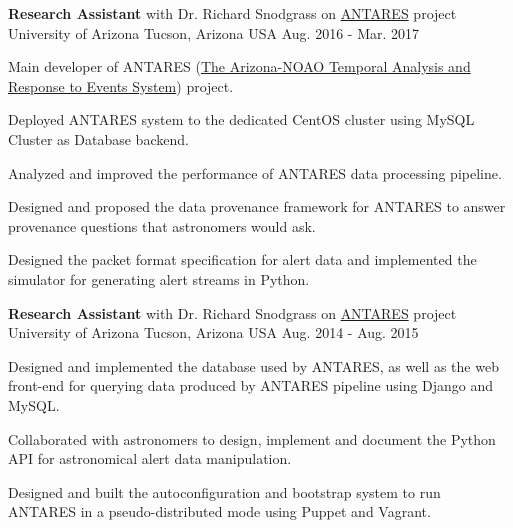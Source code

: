 

\begin{cventries}

  \cventry
    {\textbf{Research Assistant} with Dr. Richard Snodgrass on \href{https://www.noao.edu/ANTARES/}{ANTARES} project} %
    {University of Arizona} %
    {Tucson, Arizona USA} %
    {Aug. 2016 - Mar. 2017} %
    {
      \begin{cvitems} %
        \item {Main developer of ANTARES
    (\href{https://www.noao.edu/ANTARES/}{The Arizona-NOAO Temporal 
    Analysis and Response to Events System}) project.} 
        \item {Deployed ANTARES system to the dedicated CentOS
    cluster using MySQL Cluster as Database backend.}
        \item {Analyzed and improved the performance of ANTARES data
    processing pipeline.}
        \item {Designed and proposed the data provenance framework for
    ANTARES to answer provenance questions that astronomers would ask.}
        \item {Designed the packet format specification for alert data
        and implemented the simulator for generating alert streams in Python.}
      \end{cvitems}
    }

  \cventry
    {\textbf{Research Assistant} with Dr. Richard Snodgrass on \href{https://www.noao.edu/ANTARES/}{ANTARES} project} %
    {University of Arizona} %
    {Tucson, Arizona USA} %
    {Aug. 2014 - Aug. 2015} %
    {
      \begin{cvitems} %
        \item {Designed and implemented the database used by ANTARES,
    as well as the web front-end for querying data produced by ANTARES
    pipeline using Django and MySQL.} 
        \item {Collaborated with astronomers to design, implement
    and document the Python API for astronomical alert data manipulation.}
        \item {Designed and built the autoconfiguration and bootstrap
    system to run ANTARES in a pseudo-distributed mode
    using Puppet and Vagrant.}
      \end{cvitems}
    }


\end{cventries}
